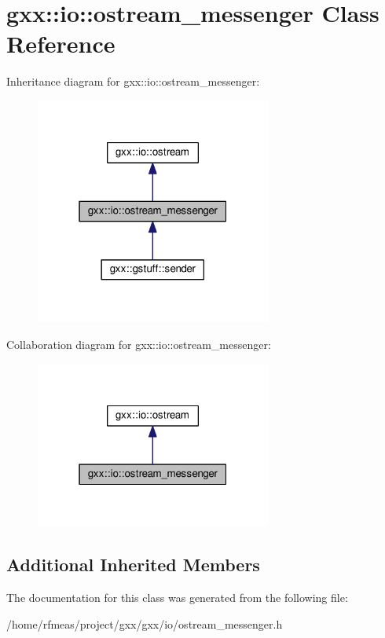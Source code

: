 \hypertarget{classgxx_1_1io_1_1ostream__messenger}{}\section{gxx\+:\+:io\+:\+:ostream\+\_\+messenger Class Reference}
\label{classgxx_1_1io_1_1ostream__messenger}


Inheritance diagram for gxx\+:\+:io\+:\+:ostream\+\_\+messenger\+:
\nopagebreak
\begin{figure}[H]
\begin{center}
\leavevmode
\includegraphics[width=220pt]{classgxx_1_1io_1_1ostream__messenger__inherit__graph}
\end{center}
\end{figure}


Collaboration diagram for gxx\+:\+:io\+:\+:ostream\+\_\+messenger\+:
\nopagebreak
\begin{figure}[H]
\begin{center}
\leavevmode
\includegraphics[width=220pt]{classgxx_1_1io_1_1ostream__messenger__coll__graph}
\end{center}
\end{figure}
\subsection*{Additional Inherited Members}


The documentation for this class was generated from the following file\+:\begin{DoxyCompactItemize}
\item 
/home/rfmeas/project/gxx/gxx/io/ostream\+\_\+messenger.\+h\end{DoxyCompactItemize}
